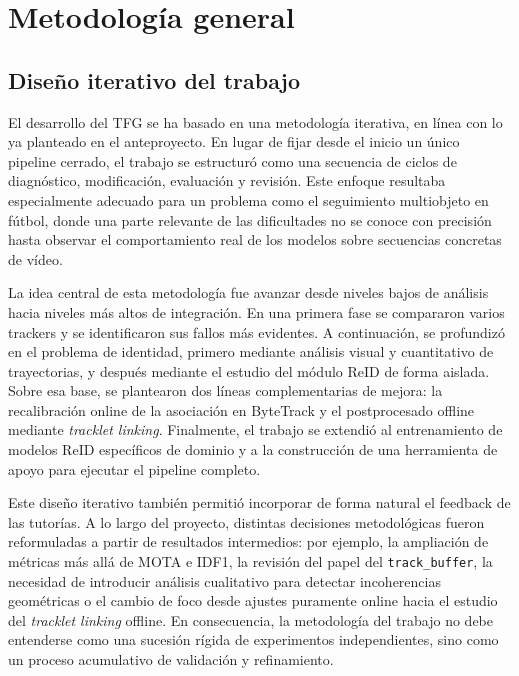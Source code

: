 \documentclass[../MAIN.tex]{subfiles}
\begin{document}
	
	
	\section{Metodología general}
	
	
	\subsection{Diseño iterativo del trabajo}
	
	El desarrollo del TFG se ha basado en una metodología iterativa, en línea con lo ya planteado en el anteproyecto. En lugar de fijar desde el inicio un único pipeline cerrado, el trabajo se estructuró como una secuencia de ciclos de diagnóstico, modificación, evaluación y revisión. Este enfoque resultaba especialmente adecuado para un problema como el seguimiento multiobjeto en fútbol, donde una parte relevante de las dificultades no se conoce con precisión hasta observar el comportamiento real de los modelos sobre secuencias concretas de vídeo.
	
	La idea central de esta metodología fue avanzar desde niveles bajos de análisis hacia niveles más altos de integración. En una primera fase se compararon varios trackers y se identificaron sus fallos más evidentes. A continuación, se profundizó en el problema de identidad, primero mediante análisis visual y cuantitativo de trayectorias, y después mediante el estudio del módulo ReID de forma aislada. Sobre esa base, se plantearon dos líneas complementarias de mejora: la recalibración online de la asociación en ByteTrack y el postprocesado offline mediante \textit{tracklet linking}. Finalmente, el trabajo se extendió al entrenamiento de modelos ReID específicos de dominio y a la construcción de una herramienta de apoyo para ejecutar el pipeline completo.
	
	Este diseño iterativo también permitió incorporar de forma natural el feedback de las tutorías. A lo largo del proyecto, distintas decisiones metodológicas fueron reformuladas a partir de resultados intermedios: por ejemplo, la ampliación de métricas más allá de MOTA e IDF1, la revisión del papel del \texttt{track\_buffer}, la necesidad de introducir análisis cualitativo para detectar incoherencias geométricas o el cambio de foco desde ajustes puramente online hacia el estudio del \textit{tracklet linking} offline. En consecuencia, la metodología del trabajo no debe entenderse como una sucesión rígida de experimentos independientes, sino como un proceso acumulativo de validación y refinamiento.
	
\end{document}

